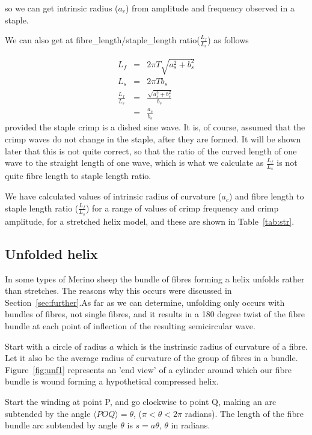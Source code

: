 \documentclass[titlepage,10pt]{article}  %
\begin{document}
so we can get intrinsic radius ($a_{c}$) from amplitude and frequency observed in a staple.

We can also get at fibre\_length/staple\_length ratio($\frac{L_{f}}{L_{s}}$) as follows

\begin{eqnarray}
\label{eqn:rsh}
L_{f} & = & 2 \pi T\sqrt{a_{s}^{2} + b_{s}^{2}}  \nonumber \\
L_{s} & = & 2 \pi T b_{s}  \nonumber \\
\frac{L_{f}}{L_{s}} & = & \frac{\sqrt{a_{s}^{2} + b_{s}^{2}}}{b_{s}} \\
  & = & \frac{a_{c}}{b_{s}}
\end{eqnarray}
 provided the staple crimp is a dished sine wave. It is, of course, assumed that the crimp waves do not change in the staple, after they are formed. It will be shown later that this is not quite correct, so that the ratio of the curved length of one wave to the straight length of one wave, which is what we calculate as $\frac{L_{f}}{L_{s}}$ is not quite fibre length to staple length ratio.

We have calculated values of intrinsic radius of curvature ($a_{c}$) and fibre length to staple length ratio ($\frac{L_{f}}{L_{s}}$) for a range of values of crimp frequency and crimp amplitude, for a stretched helix model, and these are shown in Table~\ref{tab:str}.



\subsection{Unfolded helix}
\label{sec:unfoldedmath}
In some types of Merino sheep the bundle of fibres forming a helix unfolds rather than stretches. The reasons why this occurs were discussed in Section~\ref{sec:further}.As far as we can determine, unfolding only occurs with bundles of fibres, not single fibres, and it results in a 180 degree twist of the fibre bundle at each point of inflection of the resulting semicircular wave.

Start with a circle of radius $a$ which is the instrinsic radius of curvature of a fibre. Let it also be the average radius of curvature of the group of fibres in a bundle. Figure~\ref{fig:unf1} represents an 'end view' of a cylinder around which our fibre bundle is wound forming a hypothetical compressed helix. 



Start the winding at point P, and go clockwise to point Q, making an arc subtended by the angle $\langle POQ  \rangle = \theta$, ($\pi < \theta < 2\pi$ radians). 
The length of the fibre bundle arc subtended by angle $\theta$ is $s = a \theta$, {$\theta$ in radians}.
\end{document}

